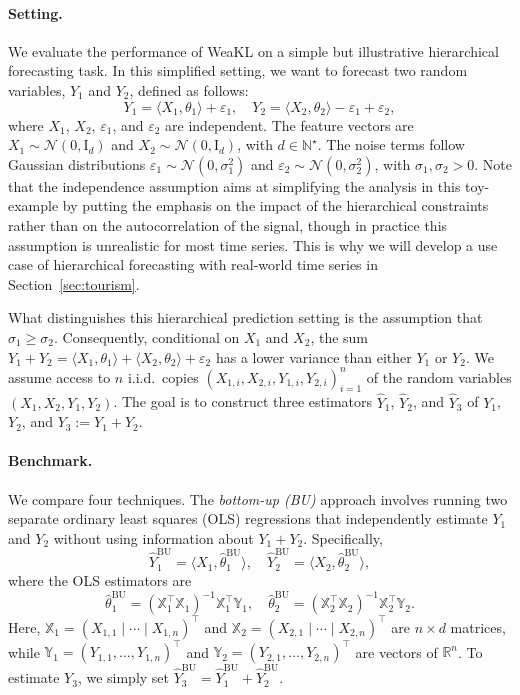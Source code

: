 \paragraph{Setting.} We evaluate the performance of WeaKL on a simple but illustrative hierarchical forecasting task. In this simplified setting, we want to forecast two random variables, $Y_1$ and $Y_2$, defined as follows:
\[Y_1 = \langle X_1, \theta_1 \rangle + \varepsilon_1, \quad Y_2 = \langle X_2, \theta_2 \rangle - \varepsilon_1 + \varepsilon_2,
\]
where $X_1$, $X_2$, $\varepsilon_1$, and $\varepsilon_2$ are independent. The feature vectors are $X_1 \sim \mathcal{N}(0, \mathrm{I}_d)$ and $X_2 \sim \mathcal{N}(0, \mathrm{I}_d)$, with $d \in \mathbb N^\star$. The noise terms follow Gaussian distributions $\varepsilon_1 \sim \mathcal{N}(0, \sigma_1^2)$ and $\varepsilon_2 \sim \mathcal{N}(0, \sigma_2^2)$, with $\sigma_1, \sigma_2 > 0$.
Note that the independence assumption aims at simplifying the analysis in this toy-example by putting the emphasis on the impact of the hierarchical constraints rather than on the autocorrelation of the signal, though in practice this assumption is unrealistic for most time series. 
This is why we will develop a use case of hierarchical forecasting with real-world time series in Section~\ref{sec:tourism}.

What distinguishes this hierarchical prediction setting is the assumption that $\sigma_1 \geq \sigma_2$. 
Consequently, conditional on $X_1$ and $X_2$, the sum $Y_1 + Y_2= \langle  X_1, \theta_1 \rangle + \langle  X_2, \theta_2 \rangle + \varepsilon_2$ has a lower variance than either $Y_1$ or $Y_2$. 
We assume access to $n$ i.i.d.~copies $(X_{1,i}, X_{2,i}, Y_{1,i}, Y_{2,i})_{i=1}^n$ of the random variables $(X_1, X_2, Y_1, Y_2)$. 
The goal is to construct three estimators $\hat{Y}_1$, $\hat{Y}_2$, and $\hat{Y}_3$ of $Y_1$, $Y_2$, and $Y_3:=Y_1+Y_2$.

\paragraph{Benchmark.} We compare four techniques. The \textit{bottom-up (BU)} approach involves running two separate ordinary least squares (OLS) regressions that independently estimate $Y_1$ and $Y_2$ without using information about $Y_1 + Y_2$. Specifically,
\[
\hat{Y}_1^{\mathrm{BU}} = \langle X_1, \hat{\theta}_1^{\mathrm{BU}} \rangle, \quad \hat{Y}_2^{\mathrm{BU}} = \langle X_2, \hat{\theta}_2^{\mathrm{BU}} \rangle,
\]
where the OLS estimators are
\[
\hat{\theta}_1^{\mathrm{BU}} = (\mathbb{X}_1^\top \mathbb{X}_1)^{-1} \mathbb{X}_1^\top \mathbb{Y}_1, \quad \hat{\theta}_2^{\mathrm{BU}} = (\mathbb{X}_2^\top \mathbb{X}_2)^{-1} \mathbb{X}_2^\top \mathbb{Y}_2.
\]
Here, $\mathbb X_1 = (X_{1,1} \mid  \cdots \mid 
    X_{1,n})^\top$ and  $\mathbb X_2 = (X_{2,1}\mid \cdots \mid
    X_{2,n})^\top$ are $n \times d$ matrices, while  $\mathbb Y_1 = (Y_{1,1}, \hdots ,
    Y_{1,n})^\top$ and  $\mathbb Y_2 = (Y_{2,1}, \hdots ,
    Y_{2,n})^\top$ are vectors of $\mathbb R^n$.
To estimate $Y_3$, we simply set $\hat Y_3^{\mathrm{BU}}  = \hat Y_1^{\mathrm{BU}}  + \hat Y_2^{\mathrm{BU}} $.

